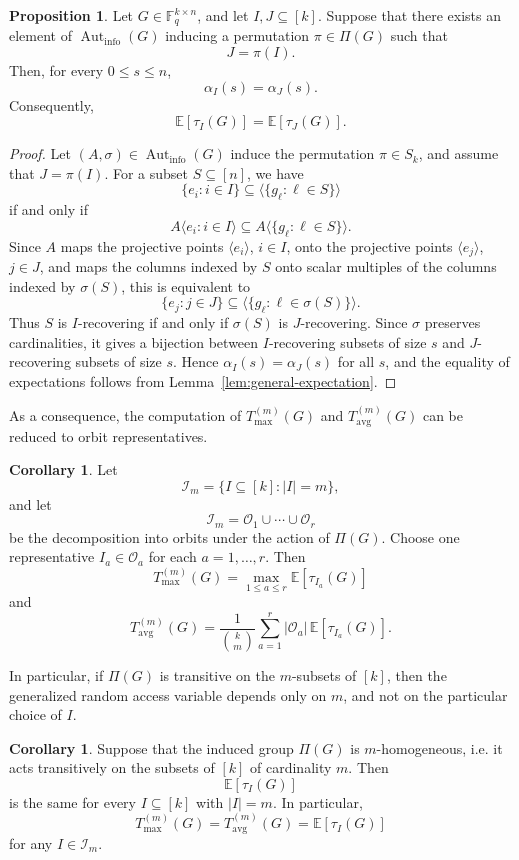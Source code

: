 \documentclass[11pt,a4paper]{article}
\numberwithin{equation}{section}
\theoremstyle{definition}
\theoremstyle{definition}
\newtheorem{proposition}[definition]{Proposition}
\newtheorem{corollary}[definition]{Corollary}
\newcommand{\F}{\mathbb{F}}
\newcommand{\E}{\mathbb{E}}
\newcommand{\cI}{\mathcal{I}}
\newcommand{\Tmax}{T_{\max}}
\newcommand{\Tavg}{T_{\mathrm{avg}}}
\newcommand{\Aut}{\operatorname{Aut}}
\begin{document}
\begin{proposition}\label{prop:automorphism-orbits}
Let $G\in \F_q^{k\times n}$, and let $I,J\subseteq[k]$. Suppose that
there exists an element of $\Aut_{\mathrm{info}}(G)$ inducing a permutation
$\pi\in \Pi(G)$ such that
\[
J=\pi(I).
\]
Then, for every $0\leq s\leq n$,
\[
\alpha_I(s)=\alpha_J(s).
\]
Consequently,
\[
\E[\tau_I(G)]=\E[\tau_J(G)].
\]
\end{proposition}

\begin{proof}
Let $(A,\sigma)\in\Aut_{\mathrm{info}}(G)$ induce the permutation
$\pi\in S_k$, and assume that $J=\pi(I)$. For a subset
$S\subseteq[n]$, we have 
\[
\{e_i:i\in I\}\subseteq \langle\{g_\ell:\ell\in S\}\rangle
\]
if and only if
\[
A\langle e_i:i\in I\rangle
\subseteq
A\langle \{g_\ell:\ell\in S\}\rangle.
\]
Since $A$ maps the projective points $\langle e_i\rangle$, $i\in I$,
onto the projective points $\langle e_j\rangle$, $j\in J$, and maps the
columns indexed by $S$ onto scalar multiples of the columns indexed by
$\sigma(S)$, this is equivalent to
\[
\{e_j:j\in J\}\subseteq \langle\{g_\ell:\ell\in \sigma(S)\}\rangle.
\]
Thus $S$ is $I$-recovering if and only if $\sigma(S)$ is
$J$-recovering. Since $\sigma$ preserves cardinalities, it gives a
bijection between $I$-recovering subsets of size $s$ and $J$-recovering
subsets of size $s$. Hence $\alpha_I(s)=\alpha_J(s)$ for all $s$, and
the equality of expectations follows from Lemma~\ref{lem:general-expectation}.
\end{proof}

As a consequence, the computation of $\Tmax^{(m)}(G)$ and
$\Tavg^{(m)}(G)$ can be reduced to orbit representatives.

\begin{corollary}\label{cor:orbit-reduction}
Let
\[
\cI_m=\{I\subseteq[k]: |I|=m\},
\]
and let
\[
\cI_m=\mathcal O_1\cup\cdots\cup\mathcal O_r
\]
be the decomposition into orbits under the action of $\Pi(G)$. Choose one
representative $I_a\in\mathcal O_a$ for each $a=1,\ldots,r$. Then
\[
\Tmax^{(m)}(G)
=
\max_{1\leq a\leq r}
\E[\tau_{I_a}(G)]
\]
and
\[
\Tavg^{(m)}(G)
=
\frac{1}{\binom{k}{m}}
\sum_{a=1}^r
|\mathcal O_a|\,\E[\tau_{I_a}(G)].
\]
\end{corollary}

In particular, if $\Pi(G)$ is transitive on the $m$-subsets of $[k]$,
then the generalized random access variable depends only on $m$, and not on
the particular choice of $I$.

\begin{corollary}\label{cor:m-homogeneous}
Suppose that the induced group $\Pi(G)$ is $m$-homogeneous, i.e. it acts
transitively on the subsets of $[k]$ of cardinality $m$. Then
\[
\E[\tau_I(G)]
\]
is the same for every $I\subseteq[k]$ with $|I|=m$. In particular,
\[
\Tmax^{(m)}(G)=\Tavg^{(m)}(G)=\E[\tau_I(G)]
\]
for any $I\in\cI_m$.
\end{corollary}
\end{document}
